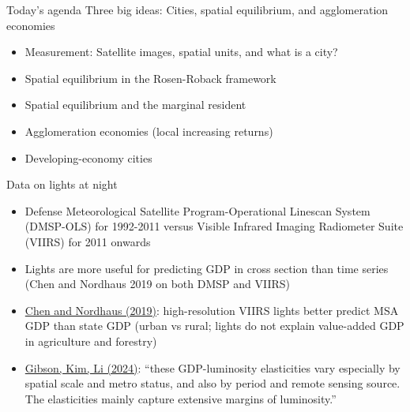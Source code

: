 \documentclass[11pt,notes=hide,aspectratio=169]{beamer}
\begin{document}
\begin{frame}{Today's agenda}
Three big ideas: Cities, spatial equilibrium, and agglomeration economies
\begin{itemize}
\item Measurement: Satellite images, spatial units, and what is a city?
\item Spatial equilibrium in the Rosen-Roback framework
\item Spatial equilibrium and the marginal resident
\item Agglomeration economies (local increasing returns)
\item Developing-economy cities
\end{itemize}
\end{frame}
\begin{frame}{Data on lights at night}
\begin{itemize}
	\item Defense Meteorological Satellite Program-Operational Linescan System (DMSP-OLS) for 1992-2011
	versus
	Visible Infrared Imaging Radiometer Suite (VIIRS) for 2011 onwards
	\item Lights are more useful for predicting GDP in cross section than time series (Chen and Nordhaus 2019 on both DMSP and VIIRS)
	\item \href{https://www.mdpi.com/2072-4292/11/9/1057}{Chen and Nordhaus (2019)}: high-resolution VIIRS lights better predict MSA GDP than state GDP (urban vs rural; lights do not explain value-added GDP in agriculture and forestry)
	\item \href{https://ideas.repec.org/p/wai/econwp/24-08.html}{Gibson, Kim, Li (2024)}: ``these GDP-luminosity elasticities vary especially by spatial scale and metro status, and also by period and remote sensing source. The elasticities mainly capture extensive margins of luminosity.''
\end{itemize}
\end{frame}
\end{document}
